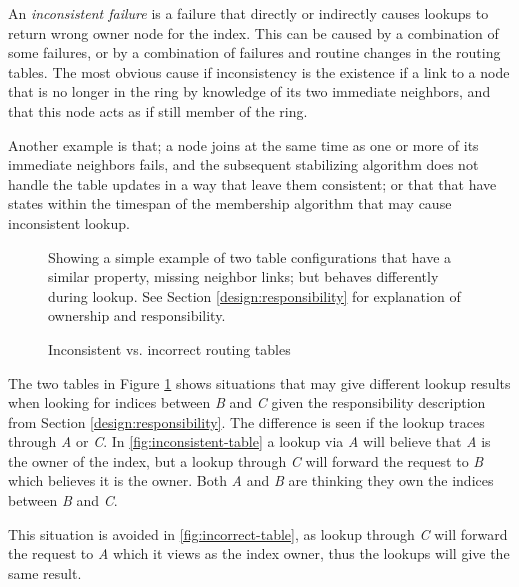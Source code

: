 An \emph{inconsistent failure} is a failure that directly or indirectly causes lookups to
 return wrong owner node for the index. This can be caused by a combination of some failures,
 or by a combination of failures and routine changes in the routing tables. The most obvious
 cause if inconsistency
 is the existence if a link to a node that is no longer in the ring by knowledge of its
 two immediate neighbors, and that this node acts as if still member of the ring.

Another example is that; a node joins at the same time as one or more of its immediate
 neighbors fails, and
 the subsequent stabilizing algorithm does not handle the table updates in a way that leave
 them consistent; or that that have states within the timespan of the membership algorithm
 that may cause inconsistent lookup.

\begin{figure}[htp] %
\begin{center}
\parbox{.9\linewidth}{\small
 Showing a simple example of two table configurations that have a similar property,
 missing neighbor links; but behaves differently during lookup. See Section
 \ref{design:responsibility} for explanation of ownership and responsibility.
}
\end{center}
\caption{Inconsistent vs. incorrect routing tables}
\label{fig:incorrect-vs-inconsisten}
\end{figure}

The two tables in Figure \ref{fig:incorrect-vs-inconsisten} shows situations that may
 give different lookup results when looking for indices between \emph{B} and
 \emph{C} given the responsibility description from Section
 \ref{design:responsibility}. The difference is seen if the lookup traces through
 \emph{A} or \emph{C}. In \ref{fig:inconsistent-table} a lookup via \emph{A} will
 believe that \emph{A} is the owner of the index, but a lookup through \emph{C} will
 forward the request to \emph{B} which believes it is the owner. Both \emph{A}
 and \emph{B} are thinking they own the indices between \emph{B} and \emph{C}.

This situation is avoided in \ref{fig:incorrect-table}, as lookup through \emph{C} will
 forward the request to \emph{A} which it views as the index owner, thus the lookups will
 give the same result.

